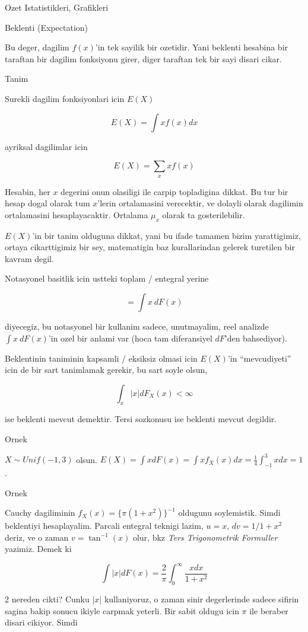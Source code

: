 \documentclass[12pt,fleqn]{article}\usepackage{../common}
\begin{document}
Ozet Istatistikleri, Grafikleri

Beklenti (Expectation) 

Bu deger, dagilim $f(x)$'in tek sayilik bir ozetidir. Yani beklenti hesabina
bir taraftan bir dagilim fonksiyonu girer, diger taraftan tek bir sayi
disari cikar. 

Tanim

Surekli dagilim fonksiyonlari icin $E(X)$

$$  E(X) = \int x f(x) dx$$

ayriksal dagilimlar icin

$$ E(X) = \sum_x xf(x) $$

Hesabin, her $x$ degerini onun olasiligi ile carpip topladigina dikkat. Bu
tur bir hesap dogal olarak tum $x$'lerin ortalamasini verecektir, ve
dolayli olarak dagilimin ortalamasini hesaplayacaktir. Ortalama $\mu_x$
olarak ta gosterilebilir.

$E(X)$'in bir tanim olduguna dikkat, yani bu ifade tamamen bizim
yarattigimiz, ortaya cikarttigimiz bir sey, matematigin baz kurallarindan
gelerek turetilen bir kavram degil. 

Notasyonel basitlik icin ustteki toplam / entegral yerine 

$$ = \int x \ dF(x) $$

diyecegiz, bu notasyonel bir kullanim sadece, unutmayalim, reel analizde
$\int x \ dF(x)$'in ozel bir anlami var (hoca tam diferansiyel $dF$'den
bahsediyor). 

Beklentinin taniminin kapsamli / eksiksiz olmasi icin $E(X)$'in
``mevcudiyeti'' icin de bir sart tanimlamak gerekir, bu sart soyle olsun, 

$$ \int_x |x|dF_X(x) < \infty $$

ise beklenti mevcut demektir. Tersi sozkonusu ise beklenti mevcut
degildir. 

Ornek 

$X \sim Unif(-1,3)$ olsun. $E(X) = \int xdF(x) = \int x f_X(x)dx = \frac{
  1}{4} \int _{ -1}^{3} x dx = 1$. 

Ornek 

Cauchy dagiliminin $f_X(x) = \{ \pi (1+x^2) \} ^{-1}$ oldugunu soylemistik. Simdi 
beklentiyi hesaplayalim. Parcali entegral teknigi lazim, $u=x$, 
$dv =
1/1+x^2$ deriz, ve o zaman $v = \tan ^{-1}(x)$ olur, bkz {\em Ters
  Trigonometrik Formuller} yazimiz. Demek ki 

$$ \int |x|dF(x) = \frac{ 2}{\pi} \int _{ 0}^{\infty}\frac{x dx}{1+x^2}  $$

2 nereden cikti? Cunku $|x|$ kullaniyoruz, o zaman sinir degerlerinde
sadece sifirin sagina bakip sonucu ikiyle carpmak yeterli. Bir sabit oldugu
icin $\pi$ ile beraber disari cikiyor. Simdi
\end{document}
